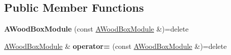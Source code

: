 \subsection*{Public Member Functions}
\begin{DoxyCompactItemize}
\item 
\mbox{\label{classwood_box_1_1module_1_1_a_wood_box_module_a8914ab2d6eaec5a88b2d03f6ee1dd3e6}} 
{\bfseries A\+Wood\+Box\+Module} (const \mbox{\hyperlink{classwood_box_1_1module_1_1_a_wood_box_module}{A\+Wood\+Box\+Module}} \&)=delete
\item 
\mbox{\label{classwood_box_1_1module_1_1_a_wood_box_module_a40bd48ed1eb33026d73040b4b5834496}} 
\mbox{\hyperlink{classwood_box_1_1module_1_1_a_wood_box_module}{A\+Wood\+Box\+Module}} \& {\bfseries operator=} (const \mbox{\hyperlink{classwood_box_1_1module_1_1_a_wood_box_module}{A\+Wood\+Box\+Module}} \&)=delete
\end{DoxyCompactItemize}
